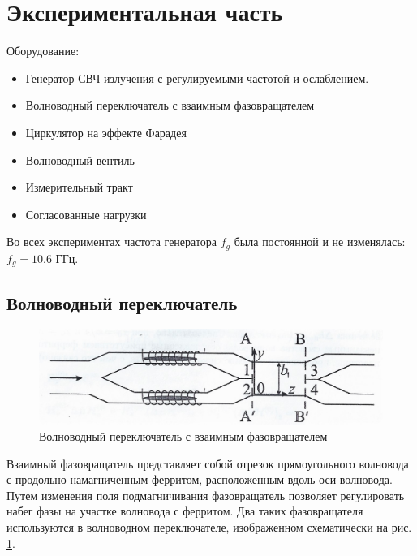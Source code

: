 \newpage
\section{Экспериментальная часть}

Оборудование: 
\begin{itemize}
    \item Генератор СВЧ излучения с регулируемыми частотой и ослаблением.
    \item Волноводный переключатель с взаимным фазовращателем
    \item Циркулятор на эффекте Фарадея
    \item Волноводный вентиль
    \item Измерительный тракт
    \item Согласованные нагрузки
\end{itemize}
Во всех экспериментах частота генератора $f_g$ была постоянной и не изменялась: $f_g = 10.6$ ГГц.
\subsection{Волноводный переключатель}
\begin{figure}[h!]
    \centering
    \includegraphics[width = 0.7\linewidth]{imgs/temp/003.jpg}
    \caption{Волноводный переключатель с взаимным фазовращателем}
    \label{fig:ex:1}
\end{figure}
Взаимный фазовращатель представляет собой отрезок прямоугольного волновода с продольно намагниченным ферритом,
расположенным вдоль оси волновода. Путем изменения поля подмагничивания фазовращатель
позволяет регулировать набег фазы на участке волновода с ферритом. Два таких фазовращателя используются в волноводном
переключателе, изображенном схематически на рис. \ref{fig:ex:1}. 




